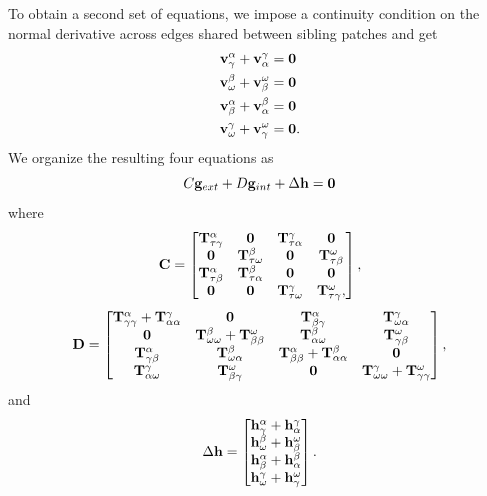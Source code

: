 To obtain a second set of equations, we impose a continuity condition on the normal derivative across edges shared between sibling patches and get
\begin{equation}
\begin{aligned}
\mathbf v^{\alpha}_{\gamma} + \mathbf v^{\gamma}_{\alpha} & = \mathbf 0 \\
\mathbf v^{\beta}_{\omega} + \mathbf v^{\omega}_{\beta} & = \mathbf 0 \\
\mathbf v^{\alpha}_{\beta}  + \mathbf v^{\beta}_{\alpha} & = \mathbf 0\\
\mathbf v^{\gamma}_{\omega} + \mathbf v^{\omega}_{\gamma} & = \mathbf 0.
\end{aligned}
\end{equation}
We organize the resulting four equations as
\begin{equation}
C \mathbf g_{ext} + D\mathbf g_{int}  + \Delta \mathbf h = \mathbf 0
\label{eq:sys_two}
\end{equation}
where
\begin{equation}
\textbf{C} = 
\begin{bmatrix}
\mathbf T^{\alpha}_{\tau\gamma} & \mathbf 0               & \mathbf T^{\gamma}_{\tau\alpha} & \mathbf 0 \\
\mathbf 0               & \mathbf T^{\beta}_{\tau\omega}  & \mathbf 0                & \mathbf T^{\omega}_{\tau\beta} \\ 
\mathbf T^{\alpha}_{\tau\beta}  & \mathbf T^{\beta}_{\tau\alpha} & \mathbf 0                & \mathbf 0 \\
\mathbf 0               & \mathbf 0               & \mathbf T^{\gamma}_{\tau\omega}  & \mathbf T^{\omega}_{\tau\gamma},
\end{bmatrix},
\end{equation}
\begin{equation}
\textbf{D} = \begin{bmatrix}
\Talphap{\gamma}{\gamma} + \Tgammap{\alpha}{\alpha} 
& \zeromat 
& \Talphap{\beta}{\gamma} 
& \Tgammap{\omega}{\alpha} \\
% 
\zeromat 
& \Tbetap{\omega}{\omega} + \Tomegap{\beta}{\beta} 
& \Tbetap{\alpha}{\omega} 
& \Tomegap{\gamma}{\beta} \\
% 
\Talphap{\gamma}{\beta} 
& \Tbetap{\omega}{\alpha} 
& \Talphap{\beta}{\beta}+ \Tbetap{\alpha}{\alpha} 
& \zeromat \\
% 
\Tgammap{\alpha}{\omega} 
& \Tomegap{\beta}{\gamma} 
& \zeromat 
& \Tgammap{\omega}{\omega} + \Tomegap{\gamma}{\gamma}
\end{bmatrix},
\label{eq:matrix_CD}
\end{equation}
and 
\begin{equation}
\Delta \mathbf h = 
\begin{bmatrix}
\mathbf h^{\alpha}_{\gamma} + \mathbf h^{\gamma}_{\alpha} \\
\mathbf h^{\beta}_{\omega} + \mathbf h^{\omega}_{\beta} \\
\mathbf h^{\alpha}_{\beta} + \mathbf h^{\beta}_{\alpha} \\
\mathbf h^{\gamma}_{\omega} + \mathbf h^{\omega}_{\gamma}
\end{bmatrix}.
\label{eq:h_diff}
\end{equation}

